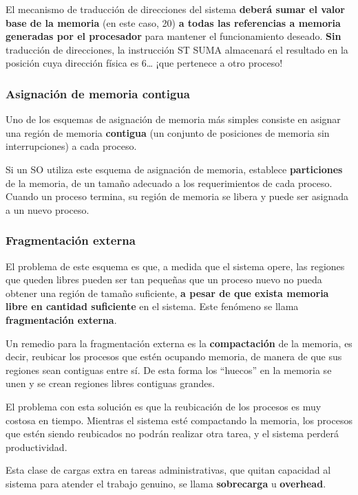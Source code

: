 \documentclass[spanish,A4,]{article}
\begin{document}
El mecanismo de traducción de direcciones del sistema \textbf{deberá
sumar el valor base de la memoria} (en este caso, 20) \textbf{a todas
las referencias a memoria generadas por el procesador} para mantener el
funcionamiento deseado. \textbf{Sin} traducción de direcciones, la
instrucción ST SUMA almacenará el resultado en la posición cuya
dirección física es 6\ldots{} ¡que pertenece a otro proceso!

\subsubsection{Asignación de memoria
contigua}\label{asignaciuxf3n-de-memoria-contigua}

Uno de los esquemas de asignación de memoria más simples consiste en
asignar una región de memoria \textbf{contigua} (un conjunto de
posiciones de memoria sin interrupciones) a cada proceso.

Si un SO utiliza este esquema de asignación de memoria, establece
\textbf{particiones} de la memoria, de un tamaño adecuado a los
requerimientos de cada proceso. Cuando un proceso termina, su región de
memoria se libera y puede ser asignada a un nuevo proceso.

\subsubsection{Fragmentación externa}\label{fragmentaciuxf3n-externa}

El problema de este esquema es que, a medida que el sistema opere, las
regiones que queden libres pueden ser tan pequeñas que un proceso nuevo
no pueda obtener una región de tamaño suficiente, \textbf{a pesar de que
exista memoria libre en cantidad suficiente} en el sistema. Este
fenómeno se llama \textbf{fragmentación externa}.

Un remedio para la fragmentación externa es la \textbf{compactación} de
la memoria, es decir, reubicar los procesos que estén ocupando memoria,
de manera de que sus regiones sean contiguas entre sí. De esta forma los
``huecos'' en la memoria se unen y se crean regiones libres contiguas
grandes.

El problema con esta solución es que la reubicación de los procesos es
muy costosa en tiempo. Mientras el sistema esté compactando la memoria,
los procesos que estén siendo reubicados no podrán realizar otra tarea,
y el sistema perderá productividad.

Esta clase de cargas extra en tareas administrativas, que quitan
capacidad al sistema para atender el trabajo genuino, se llama
\textbf{sobrecarga} u \textbf{overhead}.
\end{document}
